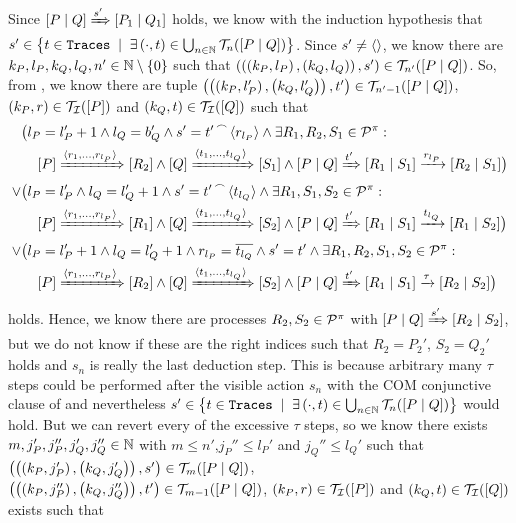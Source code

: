 \begin{prf}
\begin{description}
Since $\left[P \mid Q\right]\xRightarrow{s'}\left[P_1 \mid Q_1\right]$ holds, we know with the induction hypothesis that $s'\in\set[\exists\left(\cdot,t\right)\in\bigcup_{n\in\N}\tracesI{n}{P}{Q}]{t\in\tr}$. Since $s'\neq\langle\rangle{}$, we know there are $k_P,l_P,k_Q,l_Q,n'\in\N\setminus\set{0}$ such that $\left(\left(\left(k_P,l_P\right),\left(k_Q,l_Q\right)\right),s'\right)\in\mathcal T_{n'}(\left[P \mid Q\right])$. So, from , we know there are tuple $\left(\left(\left(k_P,l_P'\right),\left(k_Q,l_Q'\right)\right),t'\right)\in\mathcal T_{n'-1}(\left[P \mid Q\right])$, $\left(k_P,r\right)\in\mathcal{T_I}(\left[P\right])$ and $\left(k_Q,t\right)\in\mathcal{T_I}(\left[Q\right])$ such that
\begin{align*}
	&\bigl(l_P=l_P'+1\wedge l_Q=b_Q'\wedge s'={t'}^{\,\frown{}\,}{\langle r_{l_P}\rangle}\wedge\exists R_1,R_2,S_1\in\mathcal P^{\pi}: \\
 &\quad\left[P\right]\xRightarrow{\langle r_1,\ldots,r_{l_P}\rangle}\left[R_2\right]\wedge \left[Q\right]\xRightarrow{\langle t_1,\ldots,t_{l_Q}\rangle}\left[S_1\right]\wedge\left[P \mid Q\right]\xRightarrow{t'}\left[R_1 \mid S_1\right]\xrightarrow{r_{l_P}}\left[R_2 \mid S_1\right]\bigr) \\
	\vee&  \bigl(l_P=l_P'\wedge l_Q=l_Q'+1\wedge s'={t'}^{\,\frown{}\,}{\langle t_{l_Q}\rangle}\wedge\exists R_1,S_1,S_2\in\mathcal P^{\pi}:\\
&\quad \left[P\right]\xRightarrow{\langle r_1,\ldots,r_{l_P}\rangle}\left[R_1\right]\wedge \left[Q\right]\xRightarrow{\langle t_1,\ldots,t_{l_Q}\rangle}\left[S_2\right]\wedge\left[P \mid Q\right]\xRightarrow{t'}\left[R_1 \mid S_1\right]\xrightarrow{t_{l_Q}}\left[R_1 \mid S_2\right] \bigr) \\
	\vee&  \bigl(l_P=l_P'+1\wedge l_Q=l_Q'+1\wedge r_{l_P}=\overline{t_{l_Q}}\wedge s'=t'\wedge\exists R_1,R_2,S_1,S_2\in\mathcal P^{\pi}: \\
&\quad \left[P\right]\xRightarrow{\langle r_1,\ldots,r_{l_P}\rangle}\left[R_2\right]\wedge \left[Q\right]\xRightarrow{\langle t_1,\ldots,t_{l_Q}\rangle}\left[S_2\right]\wedge \left[P \mid Q\right]\xRightarrow{t'}\left[R_1 \mid S_1\right]\xrightarrow{\tau}\left[R_2 \mid S_2\right]\bigr)
\end{align*}
holds. Hence, we know there are processes $R_2,S_2\in\mathcal P^{\pi}$ with $\left[P \mid Q\right]\xRightarrow{s'}\left[R_2 \mid S_2\right]$, but we do not know if these are the right indices such that $R_2=P_2'$, $S_2=Q_2'$ holds and $s_n$ is really the last deduction step. This is because arbitrary many $\tau$ steps could be performed after the visible action $s_n$ with the COM conjunctive clause of  and nevertheless $s'\in\set[\exists\left(\cdot,t\right)\in\bigcup_{n\in\N}\tracesI{n}{P}{Q}]{t\in\tr}$ would hold. But we can revert every of the excessive $\tau$ steps, so we know there exists $m,j_P',j_P'',j_Q',j_Q''\in\mathbb N$ with $m\leq{}n'$,$j_P''\leq{}l_P'$ and $j_Q''\leq{}l_Q'$ such that $\left(\left(\left(k_P,j_P'\right),\left(k_Q,j_Q'\right)\right),s'\right)\in\mathcal T_{m}(\left[P \mid Q\right])$, $\left(\left(\left(k_P,j_P''\right),\left(k_Q,j_Q''\right)\right),t'\right)\in\mathcal T_{m-1}(\left[P \mid Q\right])$, $\left(k_P,r\right)\in\mathcal{T_I}(\left[P\right])$ and $\left(k_Q,t\right)\in\mathcal{T_I}(\left[Q\right])$ exists such that

\end{description}
\end{prf}
